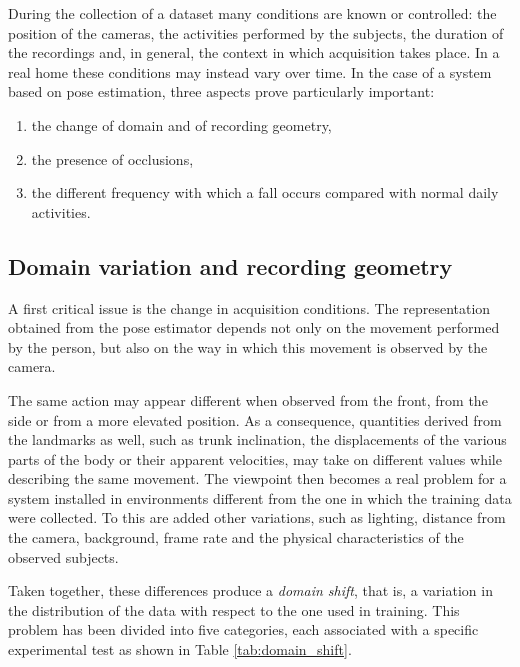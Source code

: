 During the collection of a dataset many conditions are known or
controlled: the position of the cameras, the activities performed by the
subjects, the duration of the recordings and, in general, the context in which
acquisition takes place. In a real home these conditions may instead vary over
time.
In the case of a system based on pose estimation, three aspects prove
particularly important:
\begin{enumerate}
    \item the change of domain and of recording geometry,
    \item the presence of occlusions,
    \item the different frequency with which a fall occurs compared with
          normal daily activities.
\end{enumerate}

\subsection{Domain variation and recording geometry}

A first critical issue is the change in acquisition conditions. The
representation obtained from the pose estimator depends not only on
the movement performed by the person, but also on the way in which this
movement is observed by the camera.

The same action may appear different when observed from the front, from the
side or from a more elevated position. As a consequence, quantities derived
from the landmarks as well, such as trunk inclination, the displacements of
the various parts of the body or their apparent velocities, may take on
different values while describing the same movement.
The viewpoint then becomes a real problem for a system installed in
environments different from the one in which the training data were collected.
To this are added other variations, such as lighting, distance from the
camera, background, frame rate and the physical characteristics of the
observed subjects. 


Taken together, these differences produce a \emph{domain shift}, that is, a variation in the distribution of the data with respect to the one used in training. This problem has been divided into five categories, each associated with a specific experimental test as shown in Table \ref{tab:domain_shift}.

